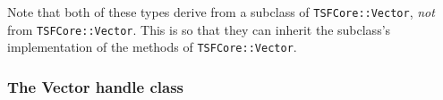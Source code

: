 Note that both of these types derive from a subclass of {\tt TSFCore::Vector}, 
{\it not} from {\tt TSFCore::Vector}. This is so that they can inherit
the subclass's implementation of the methods of {\tt TSFCore::Vector}. 

\subsubsection{The Vector handle class}
